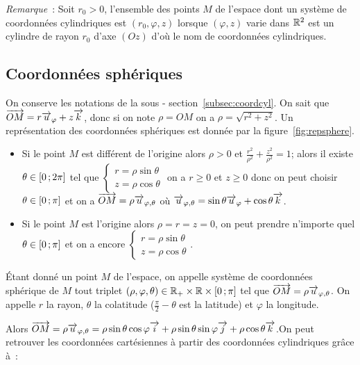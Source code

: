 \emph{Remarque}~: Soit \(r_0>0\), l'ensemble des points \(M\) de l'espace dont
un système de coordonnées cylindriques est \((r_0, \varphi, z)\) lorsque
\((\varphi, z)\) varie dans \(\mathbb{R}^2\) est un cylindre de rayon \(r_0\) d'axe
\((Oz)\) d'où le nom de coordonnées cylindriques.

\subsection{Coordonnées sphériques}
On conserve les notations de la sous - section~\ref{subsec:coordcyl}. On sait
que \(\overrightarrow{OM} = r\overrightarrow{u}_\varphi + z\overrightarrow{k}\), donc si on note \(\rho = OM\) on a
\(\rho = \sqrt{r^2 + z^2}\). Un représentation des coordonnées sphériques est
donnée par la figure~\ref{fig:repsphere}.

\begin{itemize}
  \item Si le point \(M\) est différent de l'origine alors \(\rho>0\) et
    \(\frac{r^2}{\rho^2} + \frac{z^2}{\rho^2} = 1\); alors il existe \(\theta\in
    \left[ 0 \, ; {} 2\pi \right]\) tel que \(\begin{cases} r = \rho\sin\theta \\ z =
    \rho\cos\theta \end{cases}\) on a \(r\geqslant 0\) et \(z\geqslant 0\) donc
    on peut choisir \(\theta\in \left[ 0 \, ; {} \pi \right]\) et on a
    \(\overrightarrow{OM} = \rho\overrightarrow{u}_{\varphi, \theta}\) où \(\overrightarrow{u}_{\varphi, \theta} =
    \sin\theta\overrightarrow{u}_\varphi + \cos\theta\overrightarrow{k}\).
  \item Si le point \(M\) est l'origine alors \(\rho = r = z = 0\), on peut
    prendre n'importe quel \(\theta \in \left[ 0 \, ; {} \pi \right]\) et on a encore
    \(\begin{cases} r = \rho\sin\theta \\ z = \rho\cos\theta \end{cases}\).
\end{itemize}

\begin{defdef}
  Étant donné un point \(M\) de l'espace, on appelle système de coordonnées
  sphérique de \(M\) tout triplet \((\rho, \varphi, \theta)\in\mathbb{R}_{+} \times \mathbb{R}
  \times \left[ 0 \, ; {} \pi \right]\) tel que \(\overrightarrow{OM} = \rho\overrightarrow{u}_{\varphi,
  \theta}\).  On appelle \(r\) la rayon, \(\theta\) la colatitude
  (\(\frac{\pi}{2}-\theta\) est la latitude) et \(\varphi\) la longitude.
\end{defdef}
Alors \(\overrightarrow{OM} = \rho\overrightarrow{u}_{\varphi, \theta} = \rho\sin\theta\cos\varphi\overrightarrow{i} +
\rho\sin\theta\sin\varphi\overrightarrow{j} + \rho\cos\theta\overrightarrow{k}\).On peut retrouver les
coordonnées cartésiennes à partir des coordonnées cylindriques grâce à~:

